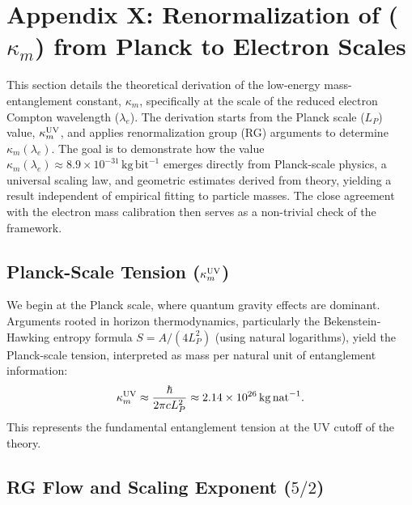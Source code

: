 \documentclass[11pt]{article}
\begin{document}
\section*{Appendix X: Renormalization of ($\kappa_m$) from Planck to Electron Scales} %

This section details the theoretical derivation of the low-energy mass-entanglement constant, $\kappa_m$, specifically at the scale of the reduced electron Compton wavelength ($\lambda_e$). The derivation starts from the Planck scale ($L_P$) value, $\kappa_m^{\rm UV}$, and applies renormalization group (RG) arguments to determine $\kappa_m(\lambda_e)$. The goal is to demonstrate how the value $\kappa_m(\lambda_e) \approx 8.9 \times 10^{-31}\,\mathrm{kg\,bit}^{-1}$ emerges directly from Planck-scale physics, a universal scaling law, and geometric estimates derived from theory, yielding a result independent of empirical fitting to particle masses. The close agreement with the electron mass calibration then serves as a non-trivial check of the framework.

\subsection*{Planck-Scale Tension ($\kappa_m^{\rm UV}$)} %

We begin at the Planck scale, where quantum gravity effects are dominant. Arguments rooted in horizon thermodynamics, particularly the Bekenstein-Hawking entropy formula $S = A / (4 L_P^2)$ (using natural logarithms), yield the Planck-scale tension, interpreted as mass per natural unit of entanglement information:
$$ \kappa_m^{\rm UV} \approx \frac{\hbar}{2\pi c L_P^2} \approx 2.14 \times 10^{26}\,\mathrm{kg\,nat}^{-1}. $$
This represents the fundamental entanglement tension at the UV cutoff of the theory.

\subsection*{RG Flow and Scaling Exponent ($5/2$)} %
\end{document}
